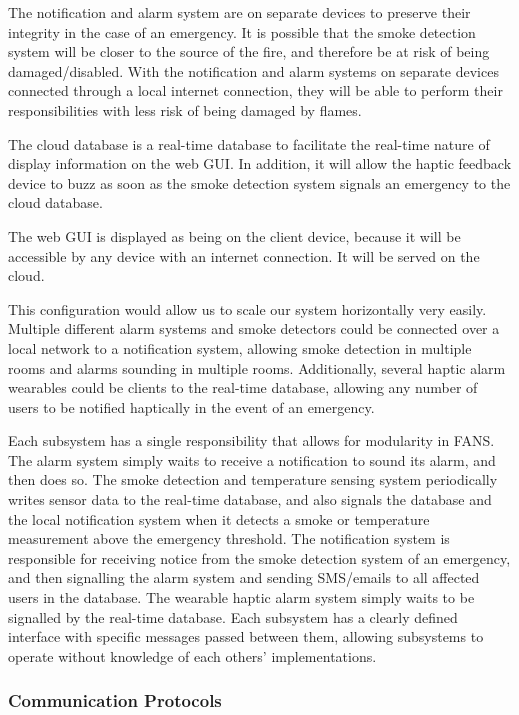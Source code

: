 The notification and alarm system are on separate devices to preserve their integrity in the case of an emergency. It
is possible that the smoke detection system will be closer to the source of the fire, and therefore be at risk of being
damaged/disabled. With the notification and alarm systems on separate devices connected through a local internet
connection, they will be able to perform their responsibilities with less risk of being damaged by flames.

The cloud database is a real-time database to facilitate the real-time nature of display information on the web GUI. In
addition, it will allow the haptic feedback device to buzz as soon as the smoke detection system signals an emergency
to the cloud database.

The web GUI is displayed as being on the client device, because it will be accessible by any device with an internet
connection. It will be served on the cloud.

This configuration would allow us to scale our system horizontally very easily. Multiple different alarm systems and
smoke detectors could be connected over a local network to a notification system, allowing smoke detection in multiple
rooms and alarms sounding in multiple rooms. Additionally, several haptic alarm wearables could be clients to the
real-time database, allowing any number of users to be notified haptically in the event of an emergency.

Each subsystem has a single responsibility that allows for modularity in FANS. The alarm system simply waits to receive
a notification to sound its alarm, and then does so. The smoke detection and temperature sensing system periodically
writes sensor data to the real-time database, and also signals the database and the local notification system when it
detects a smoke or temperature measurement above the emergency threshold. The notification system is responsible for
receiving notice from the smoke detection system of an emergency, and then signalling the alarm system and sending
SMS/emails to all affected users in the database. The wearable haptic alarm system simply waits to be signalled by the
real-time database. Each subsystem has a clearly defined interface with specific messages passed between them, allowing
subsystems to operate without knowledge of each others’ implementations.

\subsubsection{Communication Protocols}

